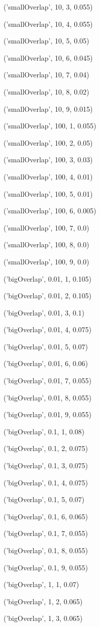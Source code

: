 \documentclass{paper}
\begin{document}
\begin{enumerate}
('smallOverlap', 10, 3, 0.055)

('smallOverlap', 10, 4, 0.055)

('smallOverlap', 10, 5, 0.05)

('smallOverlap', 10, 6, 0.045)

('smallOverlap', 10, 7, 0.04)

('smallOverlap', 10, 8, 0.02)

('smallOverlap', 10, 9, 0.015)

('smallOverlap', 100, 1, 0.055)

('smallOverlap', 100, 2, 0.05)

('smallOverlap', 100, 3, 0.03)

('smallOverlap', 100, 4, 0.01)

('smallOverlap', 100, 5, 0.01)

('smallOverlap', 100, 6, 0.005)

('smallOverlap', 100, 7, 0.0)

('smallOverlap', 100, 8, 0.0)

('smallOverlap', 100, 9, 0.0)

('bigOverlap', 0.01, 1, 0.105)

('bigOverlap', 0.01, 2, 0.105)

('bigOverlap', 0.01, 3, 0.1)

('bigOverlap', 0.01, 4, 0.075)

('bigOverlap', 0.01, 5, 0.07)

('bigOverlap', 0.01, 6, 0.06)

('bigOverlap', 0.01, 7, 0.055)

('bigOverlap', 0.01, 8, 0.055)

('bigOverlap', 0.01, 9, 0.055)

('bigOverlap', 0.1, 1, 0.08)

('bigOverlap', 0.1, 2, 0.075)

('bigOverlap', 0.1, 3, 0.075)

('bigOverlap', 0.1, 4, 0.075)

('bigOverlap', 0.1, 5, 0.07)

('bigOverlap', 0.1, 6, 0.065)

('bigOverlap', 0.1, 7, 0.055)

('bigOverlap', 0.1, 8, 0.055)

('bigOverlap', 0.1, 9, 0.055)

('bigOverlap', 1, 1, 0.07)

('bigOverlap', 1, 2, 0.065)

('bigOverlap', 1, 3, 0.065)


\end{enumerate}
\end{document}
